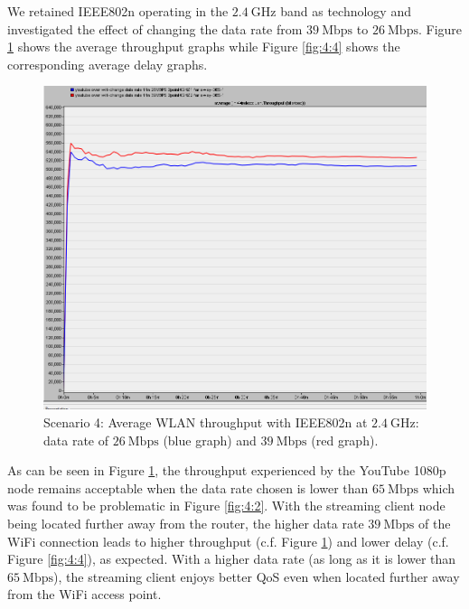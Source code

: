 We retained \gls{IEEE802}n operating in the $2.4~\mathrm{GHz}$ band as technology and investigated the effect of changing the data rate from $39~\mathrm{Mbps}$ to $26~\mathrm{Mbps}$. Figure \ref{fig:4:3} shows the average throughput graphs while Figure \ref{fig:4:4} shows the corresponding average delay graphs.

\begin{figure}[H]
	\centering
	\includegraphics[scale=0.3]{Figures/amantianrenamed/Scenario4AveThroughputof39Mbpsand26Mbps.png}
	\caption[Scenario 4: average throughput at data rates of $26~\mathrm{Mbps}$ and $39~\mathrm{Mbps}$]{Scenario 4: Average \gls{WLAN} throughput with \gls{IEEE802}n at $2.4~\mathrm{GHz}$: data rate of $26~\mathrm{Mbps}$ (blue graph) and $39~\mathrm{Mbps}$ (red graph).}
	\label{fig:4:3}
\end{figure}

As can be seen in Figure \ref{fig:4:3}, the throughput experienced by the YouTube 1080p node remains acceptable when the data rate chosen is lower than $65~\mathrm{Mbps}$ which was found to be problematic in Figure \ref{fig:4:2}. With the streaming client node being located further away from the router, the higher data rate $39~\mathrm{Mbps}$ of the \gls{WiFi} connection leads to higher throughput (c.f. Figure \ref{fig:4:3}) and lower delay (c.f. Figure \ref{fig:4:4}), as expected. With a higher data rate (as long as it is lower than $65~\mathrm{Mbps}$), the streaming client enjoys better \gls{QoS} even when located further away from the \gls{WiFi} access point.

